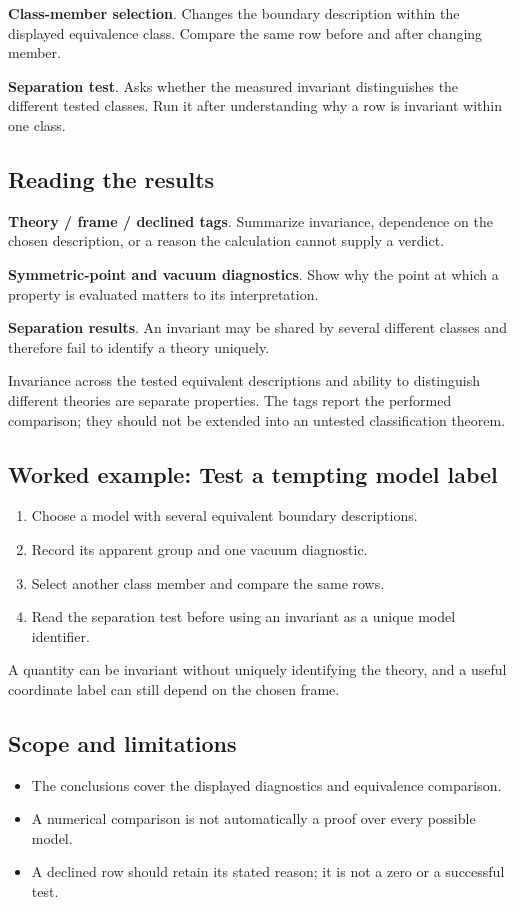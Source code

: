 \documentclass[11pt,a4paper]{article}
\begin{document}
\textbf{Class-member selection}. Changes the boundary description within the displayed equivalence class. Compare the same row before and after changing member.

\textbf{Separation test}. Asks whether the measured invariant distinguishes the different tested classes. Run it after understanding why a row is invariant within one class.

\subsection*{Reading the results}
\textbf{Theory / frame / declined tags}. Summarize invariance, dependence on the chosen description, or a reason the calculation cannot supply a verdict.

\textbf{Symmetric-point and vacuum diagnostics}. Show why the point at which a property is evaluated matters to its interpretation.

\textbf{Separation results}. An invariant may be shared by several different classes and therefore fail to identify a theory uniquely.

Invariance across the tested equivalent descriptions and ability to distinguish different theories are separate properties. The tags report the performed comparison; they should not be extended into an untested classification theorem.
\subsection*{Worked example: Test a tempting model label}
\begin{enumerate}
\item Choose a model with several equivalent boundary descriptions.
\item Record its apparent group and one vacuum diagnostic.
\item Select another class member and compare the same rows.
\item Read the separation test before using an invariant as a unique model identifier.
\end{enumerate}
A quantity can be invariant without uniquely identifying the theory, and a useful coordinate label can still depend on the chosen frame.
\subsection*{Scope and limitations}
\begin{itemize}
\item The conclusions cover the displayed diagnostics and equivalence comparison.
\item A numerical comparison is not automatically a proof over every possible model.
\item A declined row should retain its stated reason; it is not a zero or a successful test.
\end{itemize}
\end{document}
